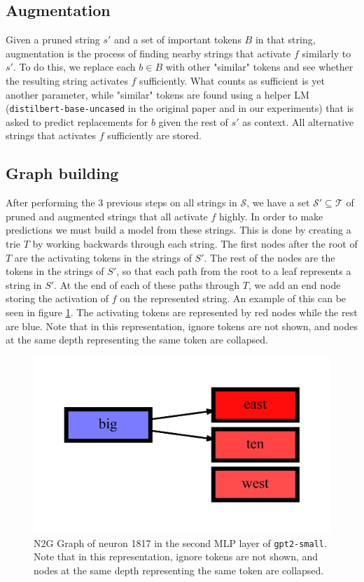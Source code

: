\subsection{Augmentation}
\label{sec:n2g_augmentation}
Given a pruned string $s'$ and a set of important tokens $B$ in that string, 
augmentation is the process of finding nearby strings 
that activate $f$ similarly to $s'$.
To do this, we replace each $b\in B$ with other "similar" tokens and 
see whether the resulting string activates $f$ sufficiently.
What counts as sufficient is yet another parameter, 
while "similar" tokens are found using a helper \ac{LM} 
(\texttt{distilbert-base-uncased} in the original paper and in our experiments) 
that is asked to predict replacements for $b$ 
given the rest of $s'$ as context.
All alternative strings that activates $f$ sufficiently are stored.

\subsection{Graph building}
\label{sec:n2g_graph_building}
After performing the 3 previous steps on all strings in $\mathcal S$, 
we have a set $\mathcal S'\subseteq\mathcal T$ 
of pruned and augmented strings that all activate $f$ highly.
In order to make predictions we must build a model from these strings.
This is done by creating a trie $T$ 
by working backwards through each string.
The first nodes after the root of $T$ are the activating tokens 
in the strings of $S'$.
The rest of the nodes are the tokens in the strings of $S'$, 
so that each path from the root to a leaf represents a string in $S'$.
At the end of each of these paths through $T$, 
we add an end node storing the activation of $f$ on the represented string.
An example of this can be seen in figure \ref{fig:n2g_graph_gpt2-small_2_1817}.
The activating tokens are represented by red nodes while the rest are blue.
Note that in this representation, ignore tokens are not shown, and nodes at the same depth representing the same token are collapsed.

\begin{figure}[ht]
    \centering
    \includegraphics[width=\textwidth]{images/gpt2-small_2_1817.pdf}
    \caption{N2G Graph of neuron 1817 in the second \ac{MLP} layer of \texttt{gpt2-small}. 
    Note that in this representation, ignore tokens are not shown, and nodes at the same depth representing the same token are collapsed.}
    \label{fig:n2g_graph_gpt2-small_2_1817}
\end{figure}

